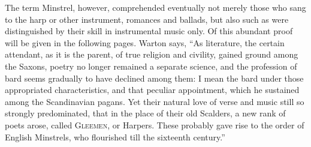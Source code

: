 The term Minstrel, however, comprehended eventually not mere\-ly those who
sang to the harp or other instrument, romances and ballads, but also such as
were distinguished by their skill in instrumental music only. Of this abundant
proof will be given in the following pages. Warton says, “As literature, the
certain attendant, as it is the parent, of true religion and civility, gained ground
among the Saxons, poetry no longer remained a separate science, and the profession
of bard seems gradually to have declined among them: I mean the bard
under those appropriated characteristics, and that peculiar appointment, which he
sustained among the Scandinavian pagans. Yet their natural love of verse and
music still so strongly predominated, that in the place of their old Scalders, a new
rank of poets arose, called \textsc{Gleemen}, or Harpers. These probably gave rise to
the order of English Minstrels, who flourished till the sixteenth century.”

